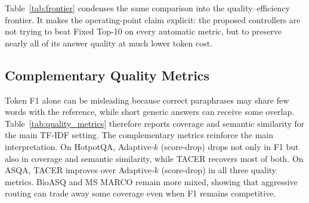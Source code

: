 \documentclass[11pt]{article}
\begin{document}
Table~\ref{tab:frontier} condenses the same comparison into the quality--efficiency frontier. It makes the operating-point claim explicit: the proposed controllers are not trying to beat Fixed Top-10 on every automatic metric, but to preserve nearly all of its answer quality at much lower token cost.

\begin{table}[t]
\centering
\small
\caption{Quality--efficiency map from the 100-query external-baseline stress test. F1 retention and token reduction are averaged over five datasets.}
\label{tab:frontier}
\end{table}

\subsection{Complementary Quality Metrics}

Token F1 alone can be misleading because correct paraphrases may share few words with the reference, while short generic answers can receive some overlap. Table~\ref{tab:quality_metrics} therefore reports coverage and semantic similarity for the main TF-IDF setting. The complementary metrics reinforce the main interpretation. On HotpotQA, Adaptive-$k$ (score-drop) drops not only in F1 but also in coverage and semantic similarity, while TACER recovers most of both. On ASQA, TACER improves over Adaptive-$k$ (score-drop) in all three quality metrics. BioASQ and MS MARCO remain more mixed, showing that aggressive routing can trade away some coverage even when F1 remains competitive.
\end{document}
